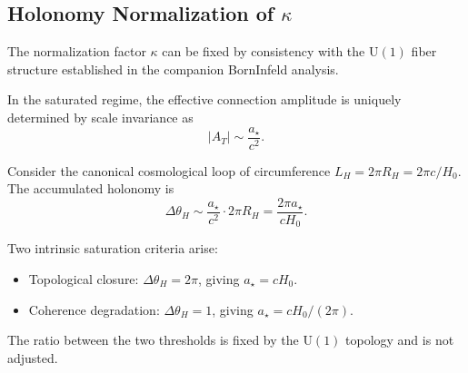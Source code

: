 \subsection{Holonomy Normalization of $\kappa$}
  \label{subsec:holonomy_normalization}

  The normalization factor $\kappa$ can be fixed by consistency with the
  $\mathrm{U}(1)$ fiber structure established in the companion Born\textendash Infeld analysis.

  In the saturated regime, the effective connection amplitude is uniquely determined by scale invariance as
  \begin{equation}
    |A_T| \sim \frac{a_\star}{c^2}.
  \end{equation}

  Consider the canonical cosmological loop of circumference $L_H = 2\pi R_H = 2\pi c/H_0$.
  The accumulated holonomy is
  \begin{equation}
    \Delta\theta_H
    \sim \frac{a_\star}{c^2} \cdot 2\pi R_H
    = \frac{2\pi a_\star}{cH_0}.
  \end{equation}

  Two intrinsic saturation criteria arise:

  \begin{itemize}
    \item Topological closure: $\Delta\theta_H = 2\pi$,
    giving $a_\star = cH_0$.
    \item Coherence degradation: $\Delta\theta_H = 1$,
    giving $a_\star = cH_0/(2\pi)$.
  \end{itemize}

  The ratio between the two thresholds is fixed by the $\mathrm{U}(1)$ topology and is not adjusted.
